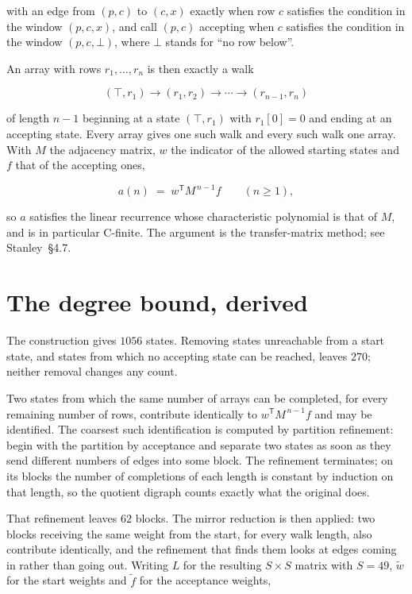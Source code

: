 \documentclass[11pt]{article}
\theoremstyle{definition}
\begin{document}
with an edge from $(p,c)$ to $(c,x)$ exactly when row $c$ satisfies the condition in the window $(p,c,x)$, and call $(p,c)$ accepting when $c$ satisfies the condition in the window $(p,c,\bot)$, where $\bot$ stands for ``no row below''.

An array with rows $r_1,\dots,r_n$ is then exactly a walk

\[(\top,r_1) \to (r_1,r_2) \to \cdots \to (r_{n-1},r_n)\]

of length $n-1$ beginning at a state $(\top,r_1)$ with $r_1[0]=0$ and ending at an accepting state. Every array gives one such walk and every such walk one array. With $M$ the adjacency matrix, $w$ the indicator of the allowed starting states and $f$ that of the accepting ones,

\[a(n) \;=\; w^{\mathsf T} M^{\,n-1} f \qquad (n \ge 1),\]

so $a$ satisfies the linear recurrence whose characteristic polynomial is that of $M$, and is in particular C-finite. The argument is the transfer-matrix method; see Stanley~\S4.7.

\section{The degree bound, derived}

The construction gives $1056$ states. Removing states unreachable from a start state, and states from which no accepting state can be reached, leaves $270$; neither removal changes any count.

Two states from which the same number of arrays can be completed, for every remaining number of rows, contribute identically to $w^{\mathsf T}M^{\,n-1}f$ and may be identified. The coarsest such identification is computed by partition refinement: begin with the partition by acceptance and separate two states as soon as they send different numbers of edges into some block. The refinement terminates; on its blocks the number of completions of each length is constant by induction on that length, so the quotient digraph counts exactly what the original does.

That refinement leaves $62$ blocks. The mirror reduction is then applied: two blocks receiving the same weight from the start, for every walk length, also contribute identically, and the refinement that finds them looks at edges coming in rather than going out. Writing $L$ for the resulting $S \times S$ matrix with $S = 49$, $\tilde w$ for the start weights and $\tilde f$ for the acceptance weights,
\end{document}
